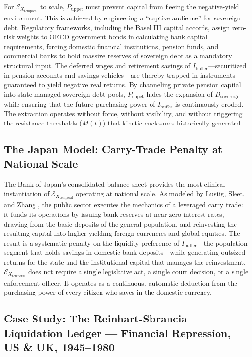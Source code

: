 For $\mathcal{E}_{X_{\text{temporal}}}$ to scale, $P_{\text{uppet}}$ must prevent capital from fleeing the negative-yield environment. This is achieved by engineering a ``captive audience'' for sovereign debt. Regulatory frameworks, including the Basel III capital accords, assign zero-risk weights to OECD government bonds in calculating bank capital requirements, forcing domestic financial institutions, pension funds, and commercial banks to hold massive reserves of sovereign debt as a mandatory structural input. The deferred wages and retirement savings of $I_{\text{buffer}}$---securitized in pension accounts and savings vehicles---are thereby trapped in instruments guaranteed to yield negative real returns. By channeling private pension capital into state-managed sovereign debt pools, $P_{\text{uppet}}$ hides the expansion of $D_{\text{sovereign}}$ while ensuring that the future purchasing power of $I_{\text{buffer}}$ is continuously eroded. The extraction operates without force, without visibility, and without triggering the resistance thresholds ($M(t)$) that kinetic enclosures historically generated.

\subsection*{The Japan Model: Carry-Trade Penalty at National Scale}

The Bank of Japan's consolidated balance sheet provides the most clinical instantiation of $\mathcal{E}_{X_{\text{temporal}}}$ operating at national scale. As modeled by Lustig, Sleet, and Zhang \cite{lustig_sleet_zhang_2023}, the public sector executes the mechanics of a leveraged carry trade: it funds its operations by issuing bank reserves at near-zero interest rates, drawing from the basic deposits of the general population, and reinvesting the resulting capital into higher-yielding foreign currencies and global equities. The result is a systematic penalty on the liquidity preference of $I_{\text{buffer}}$---the population segment that holds savings in domestic bank deposits---while generating outsized returns for the state and the institutional capital that manages the reinvestment. $\mathcal{E}_{X_{\text{temporal}}}$ does not require a single legislative act, a single court decision, or a single enforcement officer. It operates as a continuous, automatic deduction from the purchasing power of every citizen who saves in the domestic currency.

\subsection*{Case Study: The Reinhart-Sbrancia Liquidation Ledger --- Financial Repression, US \& UK, 1945--1980}
\label{cs:reinhart_sbrancia}

